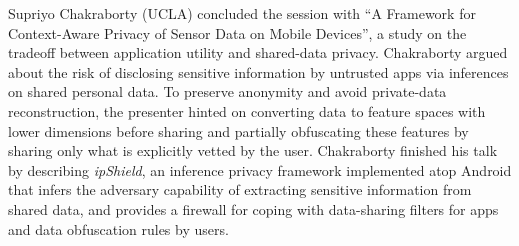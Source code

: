 Supriyo Chakraborty (UCLA) concluded the session with ``A
Framework for Context-Aware Privacy of Sensor Data on Mobile Devices'',
a study on the tradeoff between application utility and shared-data
privacy. Chakraborty argued about the risk of disclosing sensitive
information by untrusted apps via inferences on shared personal
data. To preserve anonymity and avoid private-data reconstruction, the
presenter hinted on converting data to feature spaces with lower
dimensions before sharing and partially obfuscating these features by
sharing only what is explicitly vetted by the user. Chakraborty finished
his talk by describing \emph{ipShield}, an inference privacy framework
implemented atop Android that infers the adversary capability of
extracting sensitive information from shared data, and provides a
firewall for coping with data-sharing filters for apps and data
obfuscation rules by users.

